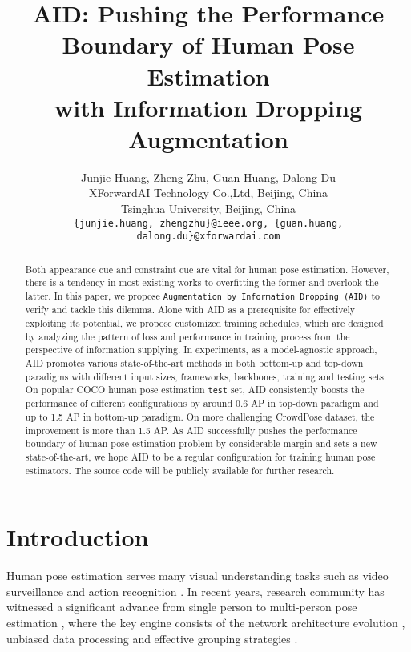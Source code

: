 \documentclass[final]{cvpr}
\begin{document}
\title{AID: Pushing the Performance Boundary of Human Pose Estimation \\ with Information Dropping Augmentation}

\author{Junjie Huang, Zheng Zhu, Guan Huang, Dalong Du \\
XForwardAI Technology Co.,Ltd, Beijing, China\\
Tsinghua University, Beijing, China\\
{\tt\small \{junjie.huang, zhengzhu\}@ieee.org, \{guan.huang, dalong.du\}@xforwardai.com}
}

\maketitle


\begin{abstract}
Both appearance cue and constraint cue are vital for human pose estimation. However, there is a tendency in most existing works to overfitting the former and overlook the latter. In this paper, we propose \texttt{Augmentation by Information Dropping (AID)} to verify and tackle this dilemma. Alone with AID as a prerequisite for effectively exploiting its potential, we propose customized training schedules, which are designed by analyzing the pattern of loss and performance in training process from the perspective of information supplying. In experiments, as a model-agnostic approach, AID promotes various state-of-the-art methods in both bottom-up and top-down paradigms with different input sizes, frameworks, backbones, training and testing sets. On popular COCO human pose estimation \texttt{test} set, AID consistently boosts the performance of different configurations by around 0.6 AP in top-down paradigm and up to 1.5 AP in bottom-up paradigm. On more challenging CrowdPose dataset, the improvement is more than 1.5 AP. As AID successfully pushes the performance boundary of human pose estimation problem by considerable margin and sets a new state-of-the-art, we hope AID to be a regular configuration for training human pose estimators. The source code will be publicly available for further research.
\end{abstract}

\section{Introduction}
Human pose estimation serves many visual understanding tasks such as video surveillance \cite{li2019state} and action recognition \cite{carreira2017quo, zhu2019action, zhu2019convolutional}. In recent years, research community has witnessed a significant advance from single person \cite{PS,DPM,DeepPose,tompson2014joint,CPM,Hourglass,fppose} to multi-person pose estimation \cite{DeepCut,DeeperCut,OpenPose,G-RMI,CPN,HRNet,AssociativeEmbedding,Higher}, where the key engine consists of the network architecture evolution \cite{CPN,SBNet,HRNet,MSPN,RSN}, unbiased data processing \cite{DARK,UDP} and effective grouping strategies \cite{DeepCut,DeeperCut,OpenPose,AssociativeEmbedding}.
\end{document}

